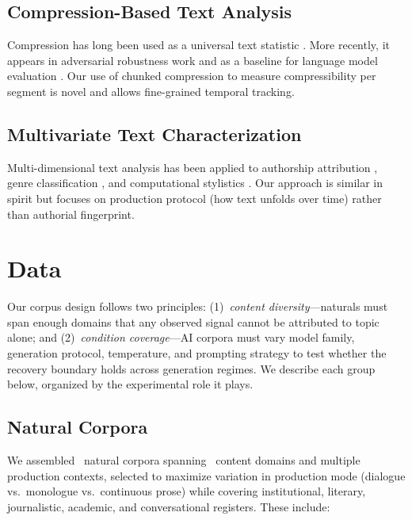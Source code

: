 \documentclass[final]{clv2025}
\begin{document}
\subsection{Compression-Based Text Analysis}

Compression has long been used as a universal text statistic \citep{teahan2003using,benedetto2002language}. More recently, it appears in adversarial robustness work \citep{holtzman2021surface} and as a baseline for language model evaluation \citep{ussishkin2023compression}. Our use of chunked compression to measure compressibility per segment is novel and allows fine-grained temporal tracking.

\subsection{Multivariate Text Characterization}

Multi-dimensional text analysis has been applied to authorship attribution \citep{stamatatos2009survey}, genre classification \citep{kessler1997automatic}, and computational stylistics \citep{hoover2013quantitative}. Our approach is similar in spirit but focuses on production protocol (how text unfolds over time) rather than authorial fingerprint.


\section{Data}

Our corpus design follows two principles: (1)~\textit{content diversity}---naturals must span enough domains that any observed signal cannot be attributed to topic alone; and (2)~\textit{condition coverage}---AI corpora must vary model family, generation protocol, temperature, and prompting strategy to test whether the recovery boundary holds across generation regimes. We describe each group below, organized by the experimental role it plays.

\subsection{Natural Corpora}

We assembled \nNatural\ natural corpora spanning \nDomains\ content domains and multiple production contexts, selected to maximize variation in production mode (dialogue vs.\ monologue vs.\ continuous prose) while covering institutional, literary, journalistic, academic, and conversational registers. These include:
\end{document}
